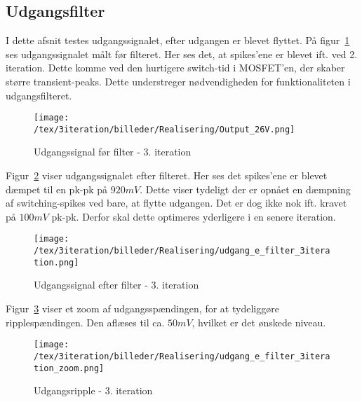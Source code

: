 
\subsection{Udgangsfilter}
I dette afsnit testes udgangssignalet, efter udgangen er blevet flyttet. På figur~\ref{fig:realisering_udgang_f_filter_3} ses udgangssignalet målt før filteret. Her ses det, at spikes'ene er blevet ift. ved 2. iteration. Dette komme ved den hurtigere switch-tid i MOSFET'en, der skaber større transient-peaks. Dette understreger nødvendigheden for funktionaliteten i udgangsfilteret.

\begin{figure}[H]
	\center
	\texttt{[image: /tex/3iteration/billeder/Realisering/Output\_26V.png]}
	\caption{Udgangssignal før filter - 3. iteration}
	\label{fig:realisering_udgang_f_filter_3}
\end{figure}

\noindent Figur~\ref{fig:realisering_udgang_e_filter_3} viser udgangssignalet efter filteret. Her ses det spikes'ene er blevet dæmpet til en pk-pk på $920mV$. Dette viser tydeligt der er opnået en dæmpning af switching-spikes ved bare, at flytte udgangen. Det er dog ikke nok ift. kravet på $100mV$ pk-pk. Derfor skal dette optimeres yderligere i en senere iteration.

\begin{figure}[H]
	\center
	\texttt{[image: /tex/3iteration/billeder/Realisering/udgang\_e\_filter\_3iteration.png]}
	\caption{Udgangssignal efter filter - 3. iteration}
	\label{fig:realisering_udgang_e_filter_3}
\end{figure}

\noindent Figur~\ref{fig:realisering_udgang_e_filter_zoom_3} viser et zoom af udgangsspændingen, for at tydeliggøre ripplespændingen. Den aflæses til ca. $50mV$, hvilket er det ønskede niveau. 

\begin{figure}[H]
	\center
	\texttt{[image: /tex/3iteration/billeder/Realisering/udgang\_e\_filter\_3iteration\_zoom.png]}
	\caption{Udgangsripple - 3. iteration}
	\label{fig:realisering_udgang_e_filter_zoom_3}
\end{figure}